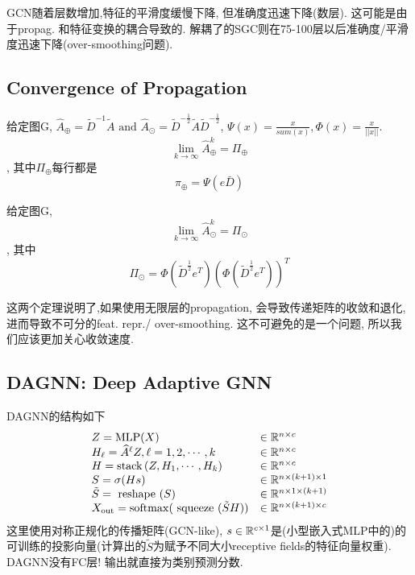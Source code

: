 \documentclass{article}
\begin{document}
GCN随着层数增加,特征的平滑度缓慢下降, 但准确度迅速下降(数层). 这可能是由于propag. 和特征变换的耦合导致的. 解耦了的SGC则在75-100层以后准确度/平滑度迅速下降(over-smoothing问题).


\subsection{Convergence of Propagation}
\begin{theorem}
    给定图G, $\widehat{A}_{\oplus}=\widetilde{D}^{-1} \widetilde{A} \text { and } \widehat{A}_{\odot}=\widetilde{D}^{-\frac{1}{2}} \widetilde{A} \widetilde{D}^{-\frac{1}{2}}
    $, $\Psi(x)=\frac{x}{sum(x)}, \Phi(x)=\frac{x}{||x||}$.
    $$
    \lim _{k \rightarrow \infty} \widehat{A}_{\oplus}^{k}=\Pi_{\oplus}
    $$,
    其中$\Pi_{\oplus}$每行都是$$
    \pi_{\oplus}=\Psi(e \bar{D})
    $$
\end{theorem}

\begin{theorem}
    给定图G, $$
    \lim _{k \rightarrow \infty} \widehat{A}_{\odot}^{k}=\Pi_{\odot}
    $$, 其中$$
    \Pi_{\odot}=\Phi\left(\tilde{D}^{\frac{1}{2}} e^{T}\right)\left(\Phi\left(\tilde{D}^{\frac{1}{2}} e^{T}\right)\right)^{T}
    $$
\end{theorem}

这两个定理说明了,如果使用无限层的propagation, 会导致传递矩阵的收敛和退化, 进而导致不可分的feat. repr./ over-smoothing. 这不可避免的是一个问题, 所以我们应该更加关心收敛速度.

\subsection{DAGNN: Deep Adaptive GNN}

DAGNN的结构如下
\begin{equation}
    \begin{array}{ll}
    Z=\operatorname{MLP}(X) & \in \mathbb{R}^{n \times c} \\
    H_{\ell}=\widehat{A}^{\ell} Z, \ell=1,2, \cdots, k & \in \mathbb{R}^{n \times c}\\
    H=\operatorname{stack}\left(Z, H_{1}, \cdots, H_{k}\right) & \in \mathbb{R}^{n \times c} \\
    S=\sigma(H s)& \in \mathbb{R}^{n \times (k+1) \times 1} \\
    \tilde{S}=\text { reshape }(S) & \in \mathbb{R}^{n \times 1 \times  (k+1)} \\
    X_{\text {out}}=\operatorname{softmax}(\text { squeeze }(\tilde{S} H)) & \in \mathbb{R}^{n \times(k+1) \times c} \\
    \end{array}
\end{equation}
这里使用对称正规化的传播矩阵(GCN-like), $s\in \mathbb{R}^{c\times 1}$是(小型嵌入式MLP中的)的可训练的投影向量(计算出的$\tilde S$为赋予不同大小receptive fields的特征向量权重). DAGNN没有FC层! 输出就直接为类别预测分数.
\end{document}
